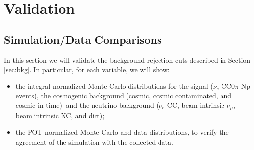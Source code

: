 
\section{Validation}

\subsection{Simulation/Data Comparisons}
In this section we will validate the background rejection cuts described in Section \ref{sec:bkg}. In particular, for each variable, we will show:
\begin{itemize}
\item the integral-normalized Monte Carlo distributions for the signal ($\nu_{e}$ CC0$\pi$-Np events), the cosmogenic background (cosmic, cosmic contaminated, and cosmic in-time), and the neutrino background ($\nu_{e}$ CC, beam intrinsic $\nu_{\mu}$, beam intrinsic NC, and dirt);

\item the POT-normalized Monte Carlo and data distributions, to verify the agreement of the simulation with the collected data.
\end{itemize}

